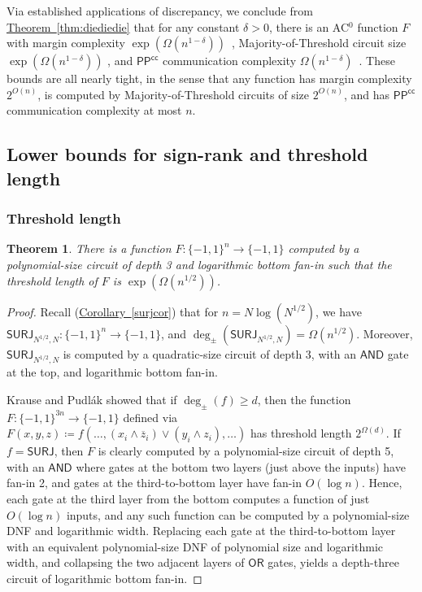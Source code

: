 \documentclass[11pt]{article}
\numberwithin{equation}{section}
\newtheorem{theorem}{Theorem}[section]
\theoremstyle{definition}
\theoremstyle{plain}
\newcommand{\expref}[2]{\hyperref[#2]{#1~\ref{#2}}}
\newcommand{\SURJ}{\mathsf{ SURJ}}
\newcommand{\OR}{\mathsf{ OR}}
\newcommand{\bits}{\{-1,1\}}
\newcommand{\AND}{\mathsf{AND}}
\begin{document}
Via established applications of discrepancy, we conclude from \expref{Theorem}{thm:diediedie}
that for any constant $\delta > 0$, there is an AC$^0$ function $F$ with margin complexity $\exp(\Omega(n^{1-\delta}))$~\cite{linial2009learning}, 
Majority-of-Threshold circuit size $\exp(\Omega(n^{1-\delta}))$ \cite{nisan, sherstovmajmaj}, and  $\mathsf{PP}^{\mathsf{cc}}$
communication complexity $\Omega(n^{1-\delta})$~\cite{klauck2001lower}. These bounds are all nearly tight, in the sense
that any function has margin complexity $2^{O(n)}$, is computed by Majority-of-Threshold circuits of size $2^{O(n)}$, 
and has $\mathsf{PP}^{\mathsf{cc}}$ communication complexity at most $n$.

\subsection{Lower bounds for sign-rank and threshold length}
\subsubsection{Threshold length}
\begin{theorem}
There is a function $F \colon \bits^n \to \bits$ computed by a 
polynomial-size  %
circuit of depth 3 and logarithmic bottom fan-in
	such that the threshold 
	length of $F$ is $\exp(\Omega(n^{1/2}))$. 
\end{theorem}
\begin{proof}
Recall (\expref{Corollary}{surjcor}) that for $n=N \log(N^{1/2})$, 
we have  %
$\SURJ_{N^{1/2}, N} \colon \bits^n \to \bits$, and 
$\deg_{\pm}(\SURJ_{N^{1/2}, N}) = \Omega(n^{1/2})$. 
Moreover, $\SURJ_{N^{1/2}, N}$ is computed by a 
quadratic-size %
circuit of depth 3, with an $\AND$ gate at the top, 
	and logarithmic bottom fan-in.
	
	Krause and Pudl{\'{a}}k showed that if $\deg_{\pm}(f) \geq d$, then the function $F \colon \bits^{3n} \to \bits$ defined
	via $F(x, y, z) \coloneqq  f(\dots, (x_i \wedge \overline{z}_i )\vee  (y_i \wedge z_i), \dots )$
	has threshold length $2^{\Omega(d)}$. 
	If $f=\SURJ$, then $F$ is clearly computed by a 
polynomial-size %
circuit of depth 5, with an $\AND$ where 
	gates at the bottom two layers (just above the inputs) have fan-in 2, and gates at the third-to-bottom layer have fan-in 
	$O(\log n)$. Hence, each gate at the third layer from the bottom computes a function of just $O(\log n)$
	inputs, and any such function can be computed by a 
polynomial-size %
DNF and logarithmic width. Replacing each gate at the third-to-bottom
layer with an equivalent polynomial-size %
DNF of polynomial size and logarithmic width, and collapsing the two adjacent layers of $\OR$
gates, yields a depth-three %
circuit of logarithmic bottom  fan-in.
\end{proof}
\end{document}
